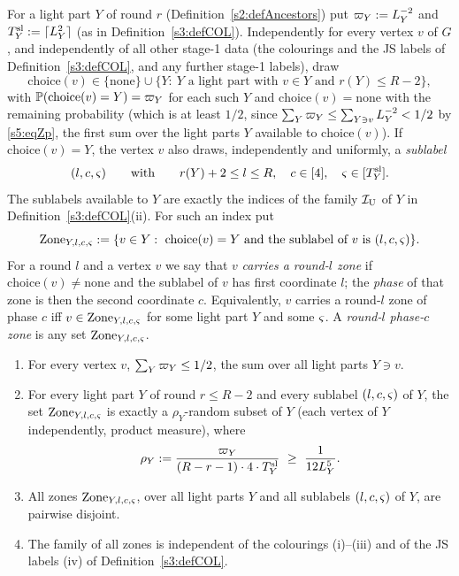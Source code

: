 \begin{definition}\label{s5:defZones}
For a light part $Y$ of round $r$ (Definition~\ref{s2:defAncestors}) put $\varpi_Y\mathrel{:=} L_Y^{-2}$ and $T^{\mathrm{sl}}_Y\mathrel{:=}\lceil L_Y^2\rceil$ (as in Definition~\ref{s3:defCOL}). Independently for every vertex $v$ of $G$, and independently of all other stage-1 data (the colourings and the JS labels of Definition~\ref{s3:defCOL}, and any further stage-1 labels), draw
\[
\mathrm{choice}(v)\in\{\mathrm{none}\}\cup\{Y:\ Y\text{ a light part with }v\in Y\text{ and }r(Y)\le R-2\},
\]
with $\mathbb{P}(\mathrm{choice}(v)=Y)=\varpi_Y$ for each such $Y$ and $\mathrm{choice}(v)=\mathrm{none}$ with the remaining probability (which is at least $1/2$, since $\sum_Y\varpi_Y\le\sum_{Y\ni v}L_Y^{-2}<1/2$ by \eqref{s5:eqZp}, the first sum over the light parts $Y$ available to $\mathrm{choice}(v)$). If $\mathrm{choice}(v)=Y$, the vertex $v$ also draws, independently and uniformly, a \emph{sublabel}
\[
(l,c,\varsigma)\qquad\text{with}\qquad r(Y)+2\le l\le R,\quad c\in[4],\quad \varsigma\in[T^{\mathrm{sl}}_Y].
\]
The sublabels available to $Y$ are exactly the indices of the family $\mathcal{I}_{\mathrm{U}}$ of $Y$ in Definition~\ref{s3:defCOL}(ii). For such an index put
\[
\Zone_{Y,l,c,\uslot}\defeq\{v\in Y:\ \mathrm{choice}(v)=Y\text{ and the sublabel of $v$ is }(l,c,\uslot)\}.
\]
For a round $l$ and a vertex $v$ we say that $v$ \emph{carries a round-$l$ zone} if $\mathrm{choice}(v)\ne\mathrm{none}$ and the sublabel of $v$ has first coordinate $l$; the \emph{phase} of that zone is then the second coordinate $c$. Equivalently, $v$ carries a round-$l$ zone of phase $c$ iff $v\in\mathrm{Zone}_{Y,l,c,\varsigma}$ for some light part $Y$ and some $\varsigma$. A \emph{round-$l$ phase-$c$ zone} is any set $\mathrm{Zone}_{Y,l,c,\varsigma}$.
\deps{\ref{s2:defAncestors}, \ref{s3:defCOL}, \ref{s2:propStructure}, \ref{s2:lemTower}, \ref{s1:condG1}}
\end{definition}

\begin{lemma}[zones]\label{s5:lemZones}
\begin{enumerate}
\item[(i)] For every vertex $v$, $\sum_{Y}\varpi_Y\le 1/2$, the sum over all light parts $Y\ni v$.
\item[(ii)] For every light part $Y$ of round $r\le R-2$ and every sublabel $(l,c,\varsigma)$ of $Y$, the set $\mathrm{Zone}_{Y,l,c,\varsigma}$ is exactly a $\rho_Y$-random subset of $Y$ (each vertex of $Y$ independently, product measure), where
\[
\rho_Y\mathrel{:=}\frac{\varpi_Y}{(R-r-1)\cdot 4\cdot T^{\mathrm{sl}}_Y}\ \ge\ \frac{1}{12L_Y^5}.
\]
\item[(iii)] All zones $\mathrm{Zone}_{Y,l,c,\varsigma}$, over all light parts $Y$ and all sublabels $(l,c,\varsigma)$ of $Y$, are pairwise disjoint.
\item[(iv)] The family of all zones is independent of the colourings (i)--(iii) and of the JS labels (iv) of Definition~\ref{s3:defCOL}.
\end{enumerate}
\deps{\ref{s5:defZones}, \ref{s2:propStructure}, \ref{s2:lemTower}, \ref{s1:condG1}, \ref{s3:defCOL}}
\end{lemma}

